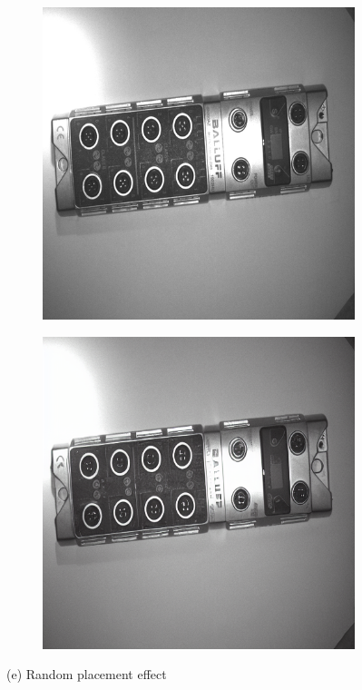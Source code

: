 \documentclass[12pt,DIV14,BCOR12mm,a4paper,footinclude=false,headinclude,parskip=half-,twoside,openright,cleardoublepage=empty,toc=index,bibliography=totoc,listof=totoc]{scrreprt}
\numberwithin{equation}{chapter}
\begin{document}
\begin{figure}
    \vspace{0.3cm} %

    \begin{subfigure}[t]{0.24\textwidth}
        \centering
        \includegraphics[width=\textwidth]{../media/diff_bni_random_real.png}
    \end{subfigure}%
    \hspace{0.02\textwidth}
    \begin{subfigure}[t]{0.24\textwidth}
        \centering
        \includegraphics[width=\textwidth]{../media/diff_bni_random_fake.png}
    \end{subfigure}
    \caption*{(e) Random placement effect}


\end{figure}
\end{document}
